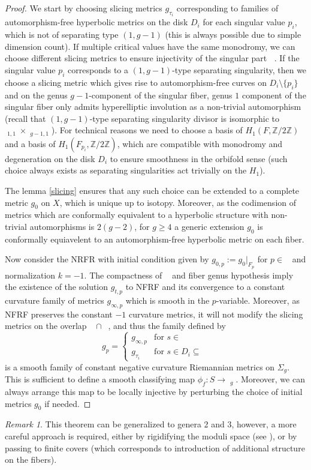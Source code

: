 \documentclass{article}
\DeclareMathOperator{\dm}{\overline{\mathcal{M}}}
\DeclareMathOperator{\sreg}{S_{\text{reg.}}}
\DeclareMathOperator{\ssing}{S_{\text{sing.}}}
\theoremstyle{plain}
\theoremstyle{remark}
\newtheorem*{rem}{Remark}
\theoremstyle{definition}
\begin{document}
\begin{proof}
    We start by choosing slicing metrics $g_{\tau_i}$ corresponding to families of automorphism-free hyperbolic metrics on the disk $D_i$ for each singular value $p_i$, which is not of separating type $(1,g-1)$ (this is always possible due to simple dimension count). If multiple critical values have the same monodromy, we can choose different slicing metrics to ensure injectivity of the singular part $\ssing$. If the singular value $p_i$ corresponds to a $(1,g-1)$-type separating singularity, then we choose a slicing metric which gives rise to automorphism-free curves on $D_i\setminus\{p_i\}$ and on the genus $g-1$-component of the singular fiber, genus $1$ component of the singular fiber only admits hyperelliptic involution as a non-trivial automorphism (recall that $(1,g-1)$-type separating singularity divisor is isomorphic to $\dm_{1,1}\times \dm_{g-1,1}$). For technical reasons we need to choose a basis of $H_1(F, \mathbb{Z}/2\mathbb{Z})$ and a basis of $H_1(F_{p_i},\mathbb{Z}/2\mathbb{Z})$, which are compatible with monodromy and degeneration on the disk $D_i$ to ensure smoothness in the orbifold sense (such choice always exists as separating singularities act trivially on the $H_1$). %
    \par 
    The lemma \ref{slicing} ensures that any such choice can be extended to a complete metric $g_0$ on $X$, which is unique up to isotopy. Moreover, as the codimension of metrics which are conformally equivalent to a hyperbolic structure with non-trivial automorphisms is $2(g-2)$, for $g\geq 4$ a generic extension $g_0$ is conformally equiavelent to an automorphism-free hyperbolic metric on each fiber. \par 
    Now consider the NRFR with initial condition given by $g_{0,p}:= g_0|_{F_p}$ for $p\in \sreg$ and normalization $k=-1$. The compactness of $\sreg$ and fiber genus hypothesis imply the existence of the solution $g_{t,p}$ to NFRF and its convergence to a constant curvature family of metrics $g_{\infty, p}$ which is smooth in the $p$-variable. Moreover, as NFRF preserves the constant $-1$ curvature metrics, it will not modify the slicing metrics on the overlap $\ssing\cap \sreg$, and thus the family defined by
    $$g_{p}=\begin{cases}
        g_{\infty,p} &\text{for }s\in \sreg \\
        g_{\tau_i} &\text{for }s\in D_i\subseteq \ssing
    \end{cases}$$
    is a smooth family of constant negative curvature Riemannian metrics on $\Sigma_g$. This is sufficient to define a smooth classifying map $\phi_f : S\to \dm_g$. Moreover, we can always arrange this map to be locally injective by perturbing the choice of initial metrics $g_0$ if needed.
\end{proof}
\begin{rem}
    This theorem can be generalized to genera 2 and 3, however, a more careful approach is required, either by rigidifying the moduli space (see \cite{Caporaso}), or by passing to finite covers (which corresponds to introduction of additional structure on the fibers).
\end{rem}
\end{document}
